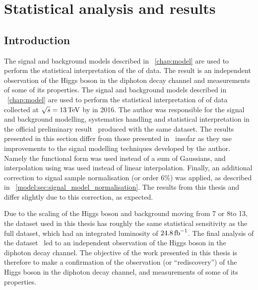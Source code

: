 \chapter{Statistical analysis and results}
\label{chap:statandresults}

\section{Introduction}
\label{sec:statandresults:Intro}

\ifNewAnalysis
The signal and background models described in \Chapter~\ref{chap:model} are used to perform the statistical interpretation of the \thisanalysislumi\ifb of data. The result is an independent observation of the Higgs boson in the diphoton decay channel and measurements of some of its properties. %
\else
The signal and background models described in \Chapter~\ref{chap:model} are used to perform the statistical interpretation of \thisanalysislumi\ifb of \RunII data collected at $\sqrt{s}=13\,\text{Te\hspace{-.08em}V}$ by \CMS in 2016. The author was responsible for the signal and background modelling, systematics handling and statistical interpretation in the official \CMS preliminary result~\cite{CMS-PAS-HIG-16-020} produced with the same dataset. The results presented in this section differ from those presented in~\cite{CMS-PAS-HIG-16-020} insofar as they use improvements to the signal modelling techniques developed by the author. Namely the \DCBpG functional form was used instead of a sum of Gaussians, and interpolation using \SSF was used instead of linear interpolation. Finally, an additional correction to signal sample normalisation (or order 6\%) was applied, as described in \Sec~\ref{model:sec:signal_model_normalisation}. The results from this thesis and~\cite{CMS-PAS-HIG-16-020} differ slightly due to this correction, as expected. 

Due to the scaling of the \SM Higgs boson and background \crosssection\s moving from 7 or 8\TeV to 13\TeV, the dataset used in this thesis has roughly the same statistical sensitivity as the full \RunI dataset, which had an integrated luminosity of $24.8\,\text{fb}^{-1}$. The final analysis of the \RunI dataset~\cite{LegacyHgg} led to an independent observation of the Higgs boson in the diphoton decay channel. The objective of the work presented in this thesis is therefore to make a confirmation of the observation (or ``rediscovery'') of the Higgs boson in the diphoton decay channel, and measurements of some of its properties.
\fi


